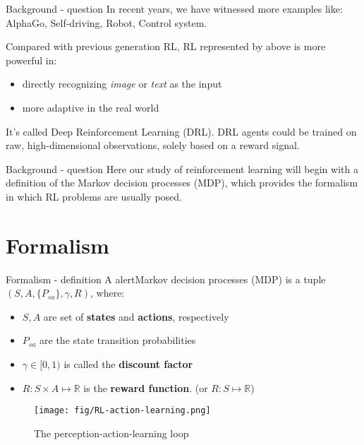 \documentclass[10pt]{beamer}
\begin{document}
\begin{frame}[fragile]{Background - question}
  In recent years, we have witnessed more examples like: AlphaGo, Self-driving, Robot, Control system.

  Compared with previous generation RL, RL represented by above is more powerful in:
  \begin{itemize}
    \item directly recognizing \emph{image} or \emph{text} as the input
    \item more adaptive in the real world
  \end{itemize}

  It's called \alert{Deep Reinforcement Learning} (DRL). DRL agents could be trained on raw, high-dimensional observations, solely based on a reward signal.
\end{frame}

\begin{frame}[fragile]{Background - question}
  Here our study of reinforcement learning will begin with a definition of
the \alert{Markov decision processes} (MDP), which provides the formalism in
which RL problems are usually posed.
\end{frame}

\section{Formalism}

\begin{frame}{Formalism - definition}
  A alert{Markov decision processes} (MDP) is a tuple $(S, A, \{P_{sa}\}, \gamma, R)$, where:
  \begin{itemize}
    \item $S, A$ are set of \textbf{states} and \textbf{actions}, respectively
    \item $P_{sa}$ are the state transition probabilities
    \item $\gamma\in [0, 1)$ is called the \textbf{discount factor}
    \item $R : S \times A \mapsto \mathbb{R}$ is the \textbf{reward function}. (or $R : S \mapsto \mathbb{R}$)
  \end{itemize}

	\begin{figure}[htbp]
    \centering
    \texttt{[image: fig/RL-action-learning.png]}
    \caption{The perception-action-learning loop}
  \end{figure}

\end{frame}
\end{document}
